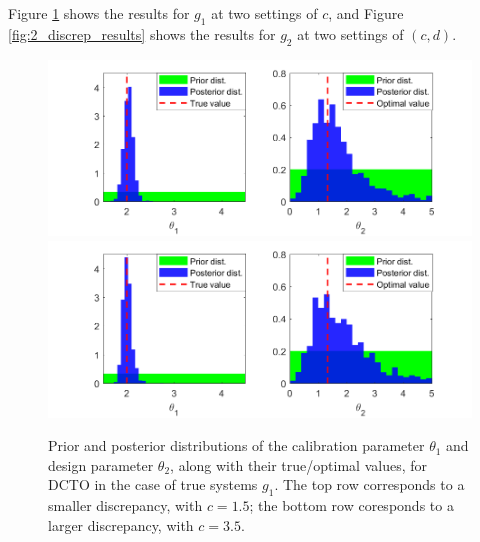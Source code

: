 \documentclass[12pt]{article}
\begin{document}
%
Figure \ref{fig:1_discrep_results} shows the results for $g_1$ at two settings of $c$, and Figure \ref{fig:2_discrep_results} shows the results for $g_2$ at two settings of $(c,d)$.
%
\begin{figure}
\centering
\includegraphics[scale=0.85]{FIG_discrepancy1_results}
\includegraphics[scale=0.85]{FIG_discrepancy2_results}
\captionsetup{width=.85\linewidth}
\caption{Prior and posterior distributions of the calibration parameter $\theta_1$ and design parameter $\theta_2$, along with their true/optimal values, for DCTO in the case of true systems $g_1$. The top row corresponds to a smaller discrepancy, with $c=1.5$; the bottom row coresponds to a larger discrepancy, with $c=3.5$.}
\label{fig:1_discrep_results}
\end{figure}
%
\end{document}
